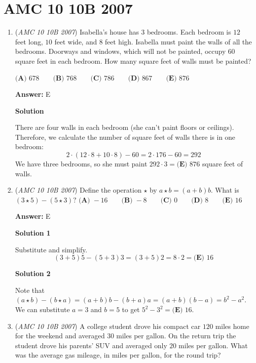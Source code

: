 \section{AMC 10 10B 2007}
        \begin{enumerate}
        	\item (\textit{AMC 10 10B 2007}) Isabella's house has $3$ bedrooms. Each bedroom is $12$ feet long, $10$ feet wide, and $8$ feet high. Isabella must paint the walls of all the bedrooms. Doorways and windows, which will not be painted, occupy $60$ square feet in each bedroom. How many square feet of walls must be painted?


 $\textbf{(A) } 678 \qquad\textbf{(B) } 768 \qquad\textbf{(C) } 786 \qquad\textbf{(D) } 867 \qquad\textbf{(E) } 876$

 \textbf{Answer: }E



\textbf{Solution}

There are four walls in each bedroom (she can't paint floors or ceilings). Therefore, we calculate the number of square feet of walls there is in one bedroom:
 \[2\cdot(12\cdot8+10\cdot8)-60=2\cdot176-60=292\]We have three bedrooms, so she must paint $292\cdot3=\boxed{\textbf{(E) }876}$ square feet of walls.

 


	\item (\textit{AMC 10 10B 2007}) Define the operation $\star$ by $a \star b = (a+b)b.$ What is $(3 \star 5) - (5 \star 3)?$
$\textbf{(A) } -16 \qquad\textbf{(B) } -8 \qquad\textbf{(C) } 0 \qquad\textbf{(D) } 8 \qquad\textbf{(E) } 16$

 \textbf{Answer: }E



\textbf{Solution 1}

Substitute and simplify.
 \[(3+5)5 - (5+3)3 = (3+5)2 = 8\cdot2 = \boxed{\textbf{(E) }16}\]




\textbf{Solution 2}

Note that$(a \star b) - (b \star a) = (a+b)b - (b+a)a= (a+b)(b-a)= b^2 - a^2$. We can substitute $a=3$ and $b=5$ to get $5^2 - 3^2 = \boxed{\textbf{(E) }16}$.

 


	\item (\textit{AMC 10 10B 2007}) A college student drove his compact car $120$ miles home for the weekend and averaged $30$ miles per gallon. On the return trip the student drove his parents' SUV and averaged only $20$ miles per gallon. What was the average gas mileage, in miles per gallon, for the round trip?



\end{enumerate}
